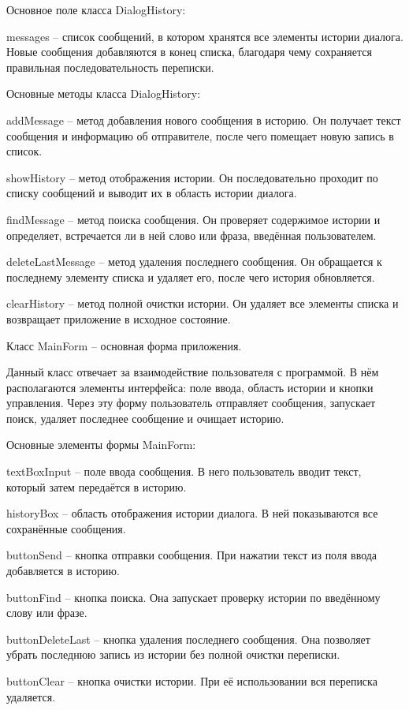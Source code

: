 \documentclass[12pt,a4paper]{article}
\begin{document}
Основное поле класса DialogHistory:

messages -- список сообщений, в котором хранятся все элементы истории диалога. Новые сообщения добавляются в конец списка, благодаря чему сохраняется правильная последовательность переписки.

Основные методы класса DialogHistory:

addMessage -- метод добавления нового сообщения в историю. Он получает текст сообщения и информацию об отправителе, после чего помещает новую запись в список.

showHistory -- метод отображения истории. Он последовательно проходит по списку сообщений и выводит их в область истории диалога.

findMessage -- метод поиска сообщения. Он проверяет содержимое истории и определяет, встречается ли в ней слово или фраза, введённая пользователем.

deleteLastMessage -- метод удаления последнего сообщения. Он обращается к последнему элементу списка и удаляет его, после чего история обновляется.

clearHistory -- метод полной очистки истории. Он удаляет все элементы списка и возвращает приложение в исходное состояние.

Класс MainForm -- основная форма приложения.

Данный класс отвечает за взаимодействие пользователя с программой. В нём располагаются элементы интерфейса: поле ввода, область истории и кнопки управления. Через эту форму пользователь отправляет сообщения, запускает поиск, удаляет последнее сообщение и очищает историю.

Основные элементы формы MainForm:

textBoxInput -- поле ввода сообщения. В него пользователь вводит текст, который затем передаётся в историю.

historyBox -- область отображения истории диалога. В ней показываются все сохранённые сообщения.

buttonSend -- кнопка отправки сообщения. При нажатии текст из поля ввода добавляется в историю.

buttonFind -- кнопка поиска. Она запускает проверку истории по введённому слову или фразе.

buttonDeleteLast -- кнопка удаления последнего сообщения. Она позволяет убрать последнюю запись из истории без полной очистки переписки.

buttonClear -- кнопка очистки истории. При её использовании вся переписка удаляется.
\end{document}
